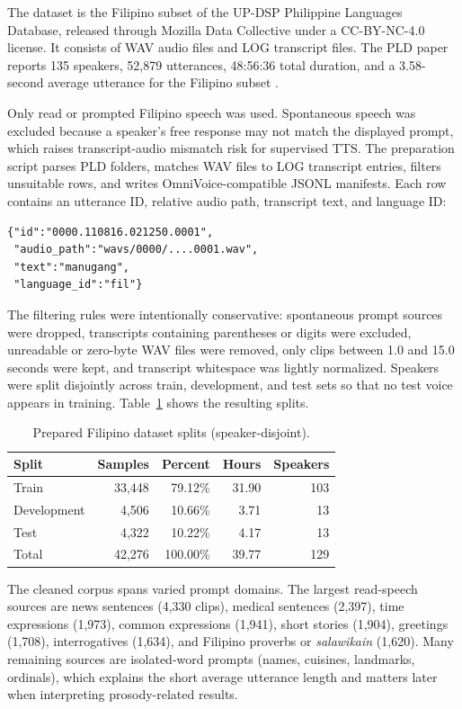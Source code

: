 \documentclass[sigconf,nonacm]{acmart}
\begin{document}
The dataset is the Filipino subset of the UP-DSP Philippine Languages Database, released through Mozilla Data Collective under a CC-BY-NC-4.0 license. It consists of WAV audio files and LOG transcript files. The PLD paper reports 135 speakers, 52,879 utterances, 48:56:36 total duration, and a 3.58-second average utterance for the Filipino subset \cite{pld}.

Only read or prompted Filipino speech was used. Spontaneous speech was excluded because a speaker's free response may not match the displayed prompt, which raises transcript-audio mismatch risk for supervised TTS. The preparation script parses PLD folders, matches WAV files to LOG transcript entries, filters unsuitable rows, and writes OmniVoice-compatible JSONL manifests. Each row contains an utterance ID, relative audio path, transcript text, and language ID:

\begin{verbatim}
{"id":"0000.110816.021250.0001",
 "audio_path":"wavs/0000/....0001.wav",
 "text":"manugang",
 "language_id":"fil"}
\end{verbatim}

The filtering rules were intentionally conservative: spontaneous prompt sources were dropped, transcripts containing parentheses or digits were excluded, unreadable or zero-byte WAV files were removed, only clips between 1.0 and 15.0 seconds were kept, and transcript whitespace was lightly normalized. Speakers were split disjointly across train, development, and test sets so that no test voice appears in training. Table~\ref{tab:prepared-split} shows the resulting splits.

\begin{table}[t]
  \centering
  \caption{Prepared Filipino dataset splits (speaker-disjoint).}
  \label{tab:prepared-split}
  \begin{tabular}{lrrrr}
    \toprule
    Split & Samples & Percent & Hours & Speakers \\
    \midrule
    Train & 33,448 & 79.12\% & 31.90 & 103 \\
    Development & 4,506 & 10.66\% & 3.71 & 13 \\
    Test & 4,322 & 10.22\% & 4.17 & 13 \\
    \midrule
    Total & 42,276 & 100.00\% & 39.77 & 129 \\
    \bottomrule
  \end{tabular}
\end{table}

The cleaned corpus spans varied prompt domains. The largest read-speech sources are news sentences (4,330 clips), medical sentences (2,397), time expressions (1,973), common expressions (1,941), short stories (1,904), greetings (1,708), interrogatives (1,634), and Filipino proverbs or \textit{salawikain} (1,620). Many remaining sources are isolated-word prompts (names, cuisines, landmarks, ordinals), which explains the short average utterance length and matters later when interpreting prosody-related results.
\end{document}
